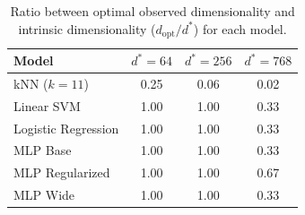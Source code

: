\begin{table}[h]
\centering
\begin{tabular}{lccc}
\toprule
\textbf{Model} & \textbf{$d^*=64$} & \textbf{$d^*=256$} & \textbf{$d^*=768$} \\
\midrule
kNN ($k=11$) & 0.25 & 0.06 & 0.02 \\
Linear SVM & 1.00 & 1.00 & 0.33 \\
Logistic Regression & 1.00 & 1.00 & 0.33 \\
MLP Base & 1.00 & 1.00 & 0.33 \\
MLP Regularized & 1.00 & 1.00 & 0.67 \\
MLP Wide & 1.00 & 1.00 & 0.33 \\
\bottomrule
\end{tabular}
\caption{Ratio between optimal observed dimensionality and intrinsic dimensionality ($d_{\mathrm{opt}} / d^*$) for each model.}
\label{tab:dimension_ratio}
\end{table}
